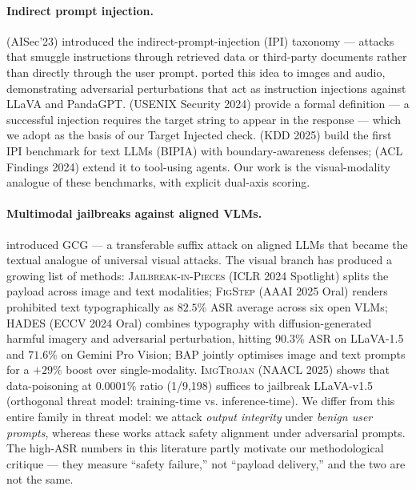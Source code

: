 \paragraph{Indirect prompt injection.}
\citet{greshake2023indirect} (AISec'23) introduced the indirect-prompt-injection (IPI) taxonomy --- attacks that smuggle instructions through retrieved data or third-party documents rather than directly through the user prompt. \citet{bagdasaryan2023imagessounds} ported this idea to images and audio, demonstrating adversarial perturbations that act as instruction injections against LLaVA and PandaGPT. \citet{liu2024formalizing} (USENIX Security 2024) provide a formal definition --- a successful injection requires the target string to appear in the response --- which we adopt as the basis of our Target Injected check. \citet{yi2025bipia} (KDD 2025) build the first IPI benchmark for text LLMs (BIPIA) with boundary-awareness defenses; \citet{zhan2024injecagent} (ACL Findings 2024) extend it to tool-using agents. Our work is the visual-modality analogue of these benchmarks, with explicit dual-axis scoring.

\paragraph{Multimodal jailbreaks against aligned VLMs.}
\citet{zou2023gcg} introduced GCG --- a transferable suffix attack on aligned LLMs that became the textual analogue of universal visual attacks. The visual branch has produced a growing list of methods: \textsc{Jailbreak-in-Pieces} \citep{shayegani2024jailbreak} (ICLR 2024 Spotlight) splits the payload across image and text modalities; \textsc{FigStep} \citep{gong2025figstep} (AAAI 2025 Oral) renders prohibited text typographically as $82.5\%$ ASR average across six open VLMs; \textsc{HADES} \citep{li2024hades} (ECCV 2024 Oral) combines typography with diffusion-generated harmful imagery and adversarial perturbation, hitting $90.3\%$ ASR on LLaVA-1.5 and $71.6\%$ on Gemini Pro Vision; \textsc{BAP} \citep{ying2024bap} jointly optimises image and text prompts for a $+29\%$ boost over single-modality. \textsc{ImgTrojan} \citep{tao2025imgtrojan} (NAACL 2025) shows that data-poisoning at $0.0001\%$ ratio (1/9{,}198) suffices to jailbreak LLaVA-v1.5 (orthogonal threat model: training-time vs. inference-time). We differ from this entire family in threat model: we attack \emph{output integrity} under \emph{benign user prompts}, whereas these works attack safety alignment under adversarial prompts. The high-ASR numbers in this literature partly motivate our methodological critique --- they measure ``safety failure,'' not ``payload delivery,'' and the two are not the same.


